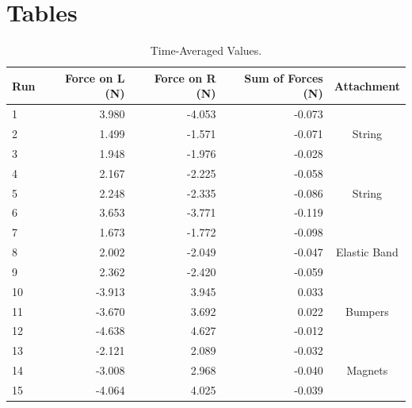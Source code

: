 \section{Tables}
\begin{table}[ht]
    \centering
    \begin{tabular}{|l|r|r|r|c|}
        \hline
        Run & Force on L (N) & Force on R (N) & Sum of Forces (N) & Attachment \\
        \hline
        1 & 3.980 & -4.053 & -0.073 & \\
        2 & 1.499 & -1.571 & -0.071 & String \\
        3 & 1.948 & -1.976 & -0.028 & \\
        \hline
        4 & 2.167 & -2.225 & -0.058 & \\
        5 & 2.248 & -2.335 & -0.086 & String \\
        6 & 3.653 & -3.771 & -0.119 & \\
        \hline
        7 & 1.673 & -1.772 & -0.098 & \\
        8 & 2.002 & -2.049 & -0.047 & Elastic Band \\
        9 & 2.362 & -2.420 & -0.059 & \\
        \hline
        10 & -3.913 & 3.945 & 0.033 & \\
        11 & -3.670 & 3.692 & 0.022 & Bumpers \\
        12 & -4.638 & 4.627 & -0.012 & \\
        \hline
        13 & -2.121 & 2.089 & -0.032 & \\
        14 & -3.008 & 2.968 & -0.040 & Magnets \\
        15 & -4.064 & 4.025 & -0.039 & \\
        \hline
    \end{tabular}
    \caption{Time-Averaged Values.}
    \label{table:05.results}
\end{table}
\FloatBarrier
\newpage
